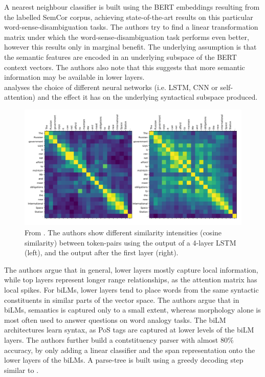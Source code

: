 \documentclass[a4paper,12pt,twoside,openright]{report}
\begin{document}
A nearest neighbour classifier is built using the BERT embeddings resulting from the labelled SemCor corpus, achieving state-of-the-art results on this particular word-sense-disambiguation tasks.
The authors try to find a linear transformation matrix under which the word-sense-disambiguation task performs even better, however this results only in marginal benefit.
The underlying assumption is that the semantic features are encoded in an underlying subspace of the BERT context vectors.
The authors also note that this suggests that more semantic information may be available in lower layers. \\

\cite{peters18} analyses the choice of different neural networks (i.e. LSTM, CNN or self-attention) and the effect it has on the underlying syntactical subspace produced.

\begin{figure}[H]
	\center
  \includegraphics[width=0.9\linewidth]{./assets/relatedwork/self_attention_analysis.png}
  \caption{From \cite{peters18}. The authors show different similarity intensities (cosine similarity) between token-pairs using the output of a 4-layer LSTM (left), and the output after the first layer (right).}
  \label{fig:embeddings_by_language}
\end{figure}

The authors argue that in general, lower layers mostly capture local information, while top layers represent longer range relationships, as the attention matrix has local spikes.
For biLMs, lower layers tend to place words from the same syntactic constituents in similar parts of the vector space.
The authors argue that in biLMs, semantics is captured only to a small extent, whereas morphology alone is most often used to answer questions on word analogy tasks.
The biLM architectures learn syntax, as PoS tags are captured at lower levels of the biLM layers.
The authors further build a contstituency parser with almost 80\% accuracy, by only adding a linear classifier and the span representation onto the lower layers of the biLMs.
A parse-tree is built using a greedy decoding step similar to \cite{joshi19b}. \\
\end{document}
